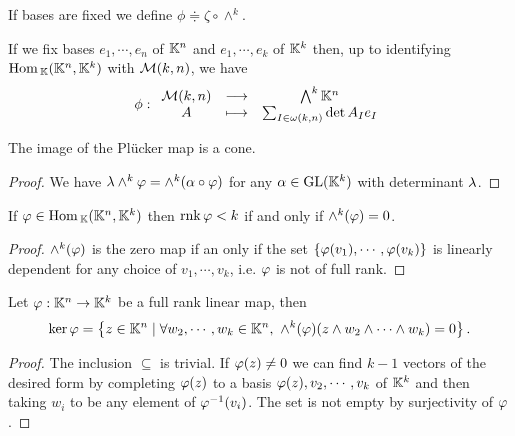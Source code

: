 \begin{notation}
If bases are fixed we define $\phi\doteqdot \zeta\circ \wedge^k$.
\end{notation}

\begin{remark}
If we fix bases $e_1,\cdots, e_n$ of $\mathbb{K}^n$ and $e_1,\cdots, e_k$ of $\mathbb{K}^k$ then, up to identifying $\mathrm{Hom}\,_{\mathbb{K}}(\mathbb{K}^n,\mathbb{K}^k)$ with $\mathcal{M}(k,n)$, we have
\[\phi:\begin{array}{ccc} {\mathcal{M}(k,n)} & \longrightarrow & {\bigwedge^k\mathbb{K}^n}\\ {A} & \longmapsto & {\sum_{I\in \omega(k,n)}\det A_I e_I} \end{array}\]
\end{remark}


\begin{proposition}\label{ImagePluckerMapIsCone}
The image of the Pl\"ucker map is a cone.
\end{proposition}
\begin{proof}
We have $\lambda\wedge^k\varphi=\wedge^k(\alpha\circ \varphi)$ for any $\alpha\in \mathrm{GL}(\mathbb{K}^k)$ with determinant $\lambda$. 
\end{proof}


\begin{lemma}\label{WhenPluckerMapIsZero}
If $\varphi\in\mathrm{Hom}\,_{\mathbb{K}}(\mathbb{K}^n,\mathbb{K}^k)$ then $\mathrm{rnk}\, \varphi<k$ if and only if $\wedge^k(\varphi)=0$.
\end{lemma}
\begin{proof}
$\wedge^k(\varphi)$ is the zero map if an only if the set $\left\{{\varphi(v_1),\cdots, \varphi(v_k)}\right\}$ is linearly dependent for any choice of $v_1,\cdots, v_k$, i.e. $\varphi$ is not of full rank.
\end{proof}

\begin{lemma}\label{CharacterizationOfKernels}
Let $\varphi:\mathbb{K}^n\to \mathbb{K}^k$ be a full rank linear map, then
\[\ker\varphi=\left\{{z\in\mathbb{K}^n\mid \forall w_2,\cdots, w_k\in \mathbb{K}^n,\ \wedge^k(\varphi)(z\wedge w_2\wedge\cdots\wedge w_k)=0}\right\}.\]
\end{lemma}
\begin{proof}
The inclusion $\subseteq$ is trivial. If $\varphi(z)\neq 0$ we can find $k-1$ vectors of the desired form by completing $\varphi(z)$ to a basis $\varphi(z),v_2,\cdots,v_k$ of $\mathbb{K}^k$ and then taking $w_i$ to be any element of $\varphi^{-1}(v_i)$. The set is not empty by surjectivity of $\varphi$.
\end{proof}

